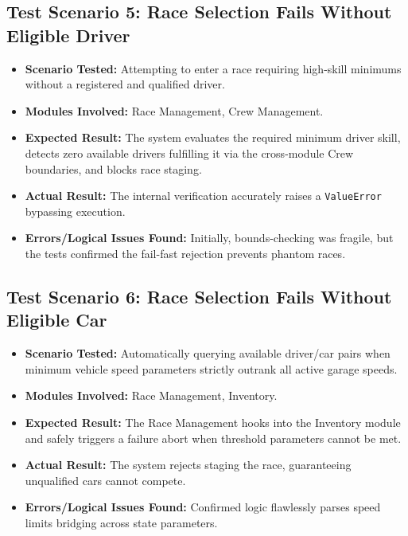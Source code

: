 \documentclass[12pt,a4paper]{article}
\begin{document}
\subsection{Test Scenario 5: Race Selection Fails Without Eligible Driver}
\begin{itemize}
    \item \textbf{Scenario Tested:} Attempting to enter a race requiring high-skill minimums without a registered and qualified driver.
    \item \textbf{Modules Involved:} Race Management, Crew Management.
    \item \textbf{Expected Result:} The system evaluates the required minimum driver skill, detects zero available drivers fulfilling it via the cross-module Crew boundaries, and blocks race staging.
    \item \textbf{Actual Result:} The internal verification accurately raises a \texttt{ValueError} bypassing execution.
    \item \textbf{Errors/Logical Issues Found:} Initially, bounds-checking was fragile, but the tests confirmed the fail-fast rejection prevents phantom races.
\end{itemize}

\subsection{Test Scenario 6: Race Selection Fails Without Eligible Car}
\begin{itemize}
    \item \textbf{Scenario Tested:} Automatically querying available driver/car pairs when minimum vehicle speed parameters strictly outrank all active garage speeds.
    \item \textbf{Modules Involved:} Race Management, Inventory.
    \item \textbf{Expected Result:} The Race Management hooks into the Inventory module and safely triggers a failure abort when threshold parameters cannot be met.
    \item \textbf{Actual Result:} The system rejects staging the race, guaranteeing unqualified cars cannot compete.
    \item \textbf{Errors/Logical Issues Found:} Confirmed logic flawlessly parses speed limits bridging across state parameters.
\end{itemize}
\end{document}
